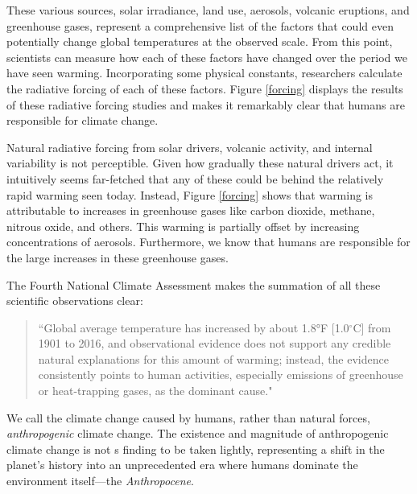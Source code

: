 These various sources, solar irradiance, land use, aerosols, volcanic eruptions, and greenhouse gases, represent a comprehensive list of the factors that could even potentially change global temperatures at the observed scale. From this point, scientists can measure how each of these factors have changed over the period we have seen warming. Incorporating some physical constants, researchers calculate the radiative forcing of each of these factors. Figure \ref{forcing} displays the results of these radiative forcing studies and makes it remarkably clear that humans are responsible for climate change. 

Natural radiative forcing from solar drivers, volcanic activity, and internal variability is not perceptible. Given how gradually these natural drivers act, it intuitively seems far-fetched that any of these could be behind the relatively rapid warming seen today. Instead, Figure \ref{forcing} shows that warming is attributable to increases in greenhouse gases like carbon dioxide, methane, nitrous oxide, and others. This warming is partially offset by increasing concentrations of aerosols. Furthermore, we know that humans are responsible for the large increases in these greenhouse gases. 

The Fourth National Climate Assessment makes the summation of all these scientific observations clear:
\begin{quote}
``Global average temperature has increased by about 1.8°F [1.0$^\circ$C] from 1901 to 2016, and observational evidence does not support any credible natural explanations for this amount of warming; instead, the evidence consistently points to human activities, especially emissions of greenhouse or heat-trapping gases, as the dominant cause." \citep{nationalar4}
\end{quote}
We call the climate change caused by humans, rather than natural forces, \emph{anthropogenic} climate change. The existence and magnitude of anthropogenic climate change is not s finding to be taken lightly, representing a shift in the planet's history into an unprecedented era where humans dominate the environment itself---the \emph{Anthropocene}.



